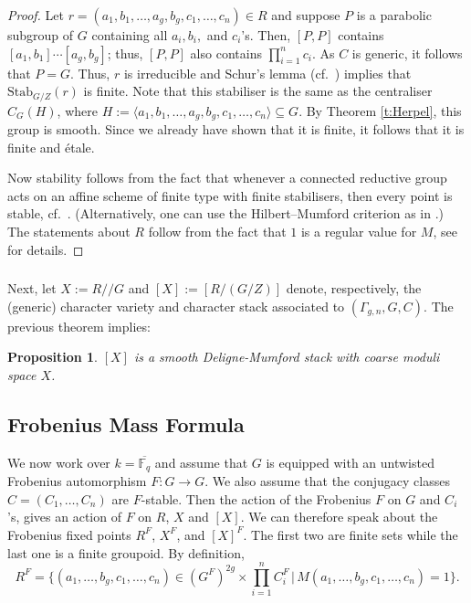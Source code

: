 \documentclass[12pt]{amsart}
\theoremstyle{plain}
\newtheorem{prop}[thm]{Proposition}
\theoremstyle{definition}
\theoremstyle{remark}
\newcommand{\ra}{\rightarrow}
\newcommand{\bX}{{X}}
\newcommand{\bR}{R}
\begin{document}
\begin{proof}  Let ${r=(a_1,b_1,\ldots, a_g, b_g, c_1,\ldots, c_n)\in \bR}$ and suppose $P$ is a parabolic subgroup of $G$ containing all $a_i, b_i,$ and $ c_i$'s. Then, $[P,P]$ contains $[a_1,b_1]\cdots [a_g, b_g]$; thus, $[P,P]$ also contains $\prod_{i=1}^n c_i$. As $C$ is generic, it follows that $P=G$. Thus, $r$ is irreducible and Schur's lemma (cf.\ \cite[\S 4]{Sikora}) implies that $\mathrm{Stab}_{G/Z}(r)$ is finite.  Note that this stabiliser is the same as the centraliser $C_G(H)$, where $H:=\langle a_1,b_1,\ldots, a_g, b_g, c_1,\ldots, c_n\rangle\subseteq G$. By Theorem \ref{t:Herpel}, this group is smooth. Since we already have shown that it is finite, it follows that it is finite and \'etale.

Now stability follows from the fact that whenever a connected reductive group acts on an affine scheme of finite type with finite stabilisers, then every point is stable, cf.\ \cite[Proposition 0.8]{Mumford}. (Alternatively, one can use the Hilbert--Mumford criterion as in \cite{Boalch14}.) The statements about $\bR$ follow from the fact that $1$ is a regular value for $M$, see \cite[\S 2]{KNP25} for details.  
\end{proof} 

\subsubsection{} 
Next, let $\bX:=\bR/\!\!/G$ and $[\bX]:=[\bR/(G/Z)]$ denote, respectively, the (generic) character variety and character stack associated to $(\Gamma_{g,n}, G, C)$. The previous theorem implies: 

\begin{prop} 
$[\bX]$ is a smooth Deligne-Mumford stack with coarse moduli space $\bX$.
\end{prop} 






\subsection{Frobenius Mass Formula} 
We now work over $k=\overline{\mathbb{F}_q}$ and assume that $G$ is equipped with an untwisted Frobenius automorphism $F: G\ra G$. 
We also assume that the conjugacy classes $C=(C_1,\ldots,C_n)$ are $F$-stable. Then the action of the Frobenius $F$ on $G$ and $C_i$'s, gives an action of $F$ on $\bR$, $\bX$ and $[\bX]$. We can therefore speak about the Frobenius fixed points $\bR^F$, $\bX^F$, and $[\bX]^F$. The first two are finite sets while the last one is a finite groupoid. 
By definition, 
\[
\bR^F=\Big\{(a_1,\ldots, b_g, c_1,\ldots,c_n)\in (G^F)^{2g}\times \prod_{i=1}^n C_i^F \, \Big|\, M(a_1,\ldots,b_g, c_1,\ldots,c_n)=1\Big\}.
\]
\end{document}
